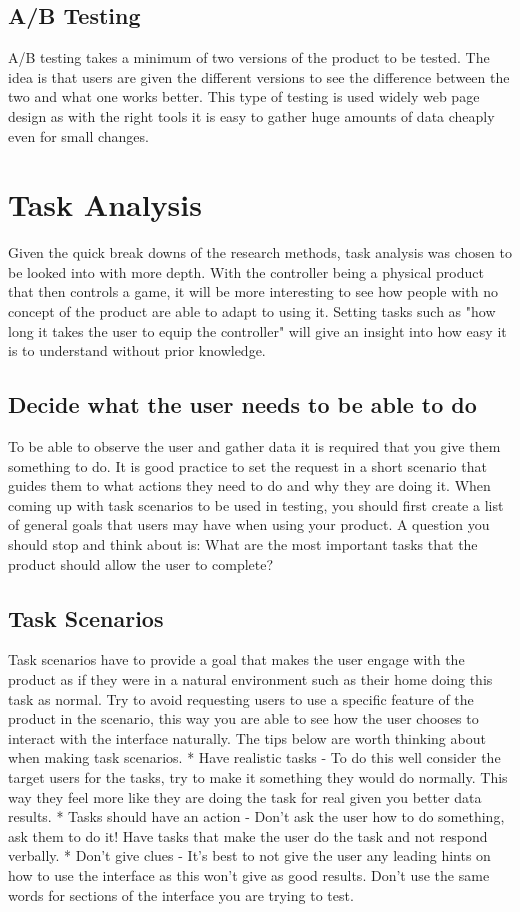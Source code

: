 \documentclass{scrartcl}
\begin{document}
	\subsection{A/B Testing}
		A/B testing takes a minimum of two versions of the product to be tested. The idea is that users are given the different versions to see the difference between the two and what one works better. This type of testing is used widely web page design\citep{azevedo2018b} as with the right tools it is easy to gather huge amounts of data cheaply even for small changes.
		
	\section{Task Analysis}
		Given the quick break downs of the research methods, task analysis was chosen to be looked into with more depth. With the controller being a physical product that then controls a game, it will be more interesting to see how people with no concept of the product are able to adapt to using it. Setting tasks such as "how long it takes the user to equip the controller" will give an insight into how easy it is to understand without prior knowledge.
		
	\subsection{Decide what the user needs to be able to do}
		To be able to observe the user and gather data it is required that you give them something to do. It is good practice to set the request in a short scenario that guides them to what actions they need to do and why they are doing it. When coming up with task scenarios to be used in testing, you should first create a list of general goals that users may have when using your product. A question you should stop and think about is: What are the most important tasks that the product should allow the user to complete?\citep{nielsen_norman_tognazzini_2018}
	
	\subsection{Task Scenarios}
		Task scenarios have to provide a goal that makes the user engage with the product as if they were in a natural environment such as their home doing this task as normal. Try to avoid requesting users to use a specific feature of the product in the scenario, this way you are able to see how the user chooses to interact with the interface naturally. The tips below are worth thinking about when making task scenarios.\citep{nielsen_norman_tognazzini_2018}
		* Have realistic tasks - To do this well consider the target users for the tasks, try to make it something they would do normally. This way they feel more like they are doing the task for real given you better data results.
		* Tasks should have an action - Don't ask the user how to do something, ask them to do it! Have tasks that make the user do the task and not respond verbally.
		* Don't give clues - It's best to not give the user any leading hints on how to use the interface as this won't give as good results. Don't use the same words for sections of the interface you are trying to test.
		
\end{document}
